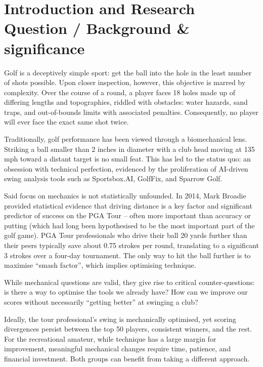 \documentclass[11pt, letterpaper]{article}
\begin{document}
\newpage
\setcounter{page}{1} %

\section{Introduction and Research Question / Background \& significance}

Golf is a deceptively simple sport: get the ball into the hole in the least number of shots possible. Upon closer inspection, however, this objective is marred by complexity. Over the course of a round, a player faces 18 holes made up of differing lengths and topographies, riddled with obstacles: water hazards, sand traps, and out-of-bounds limits with associated penalties. Consequently, no player will ever face the exact same shot twice.

Traditionally, golf performance has been viewed through a biomechanical lens. Striking a ball smaller than 2 inches in diameter with a club head moving at 135 mph toward a distant target is no small feat. This has led to the status quo: an obsession with technical perfection, evidenced by the proliferation of AI-driven swing analysis tools such as Sportsbox.AI, GolfFix, and Sparrow Golf.

Said focus on mechanics is not statistically unfounded. In 2014, Mark Broadie provided statistical evidence that driving distance is a key factor and significant predictor of success on the PGA Tour – often more important than accuracy or putting (which had long been hypothesised to be the most important part of the golf game). PGA Tour professionals who drive their ball 20 yards further than their peers typically save about 0.75 strokes per round, translating to a significant 3 strokes over a four-day tournament. The only way to hit the ball further is to maximise “smash factor”, which implies optimising technique.


While mechanical questions are valid, they give rise to critical counter-questions: is there a way to optimise the tools we already have? How can we improve our scores without necessarily “getting better” at swinging a club? 

Ideally, the tour professional's swing is mechanically optimised, yet scoring divergences persist between the top 50 players, consistent winners, and the rest. For the recreational amateur, while technique has a large margin for improvement, meaningful mechanical changes require time, patience, and financial investment. Both groups can benefit from taking a different approach.
\end{document}
